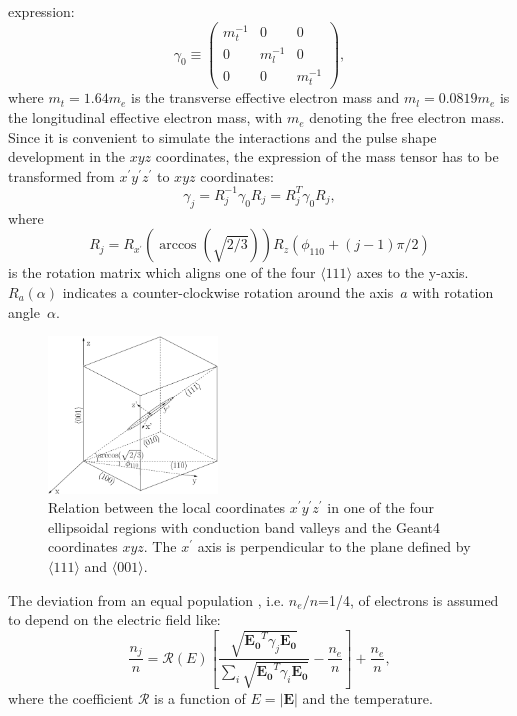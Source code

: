 expression:
\begin{equation} 
\label{eq:pss:g0} 
\gamma_{0} \equiv \left( 
\begin{array}{ccc} 
m_{t}^{-1} & 0 & 0 \\ 
0 & m_{l}^{-1} & 0 \\ 
0 & 0 & m_{t}^{-1} 
\end{array} \right), 
\end{equation} 
where $m_{t} = 1.64m_{e}$ is the transverse effective electron mass
and $m_{l} = 0.0819m_{e}$ is the longitudinal effective electron mass,
with $m_{e}$ denoting the free electron mass. Since it is convenient
to simulate the interactions and the pulse shape development in the
$xyz$ coordinates, the expression of the mass tensor has to be
transformed from $x^{\prime}y^{\prime}z^{\prime}$ to $xyz$
coordinates:
\begin{equation} 
\label{eq:pss:gs} 
\gamma_{j} = R_{j}^{-1}\gamma_{0}R_{j} = R_{j}^{T}\gamma_{0}R_{j}, 
\end{equation} 
where 
\begin{equation} 
\label{eq:pss:rs} 
R_{j} = R_{x^{\prime}}(\arccos(\sqrt{2/3}))R_{z}(\phi_{110}+(j-1)\pi/2) 
\end{equation} 
is the rotation matrix which aligns one of the four $\langle 111
\rangle$ axes to the y-axis. $R_a(\alpha)$ indicates a
counter-clockwise rotation around the axis~$a$ with rotation
angle~$\alpha$.
 
\begin{figure} 
\centering 
\includegraphics[width=0.4\textwidth]{axes}   
\caption{Relation between the local coordinates
$x^{\prime}y^{\prime}z^{\prime}$ in one of the four ellipsoidal
regions with conduction band valleys and the Geant4 coordinates
$xyz$. The $x^{\prime}$ axis is perpendicular to the plane defined by
$\langle111\rangle$ and $\langle001\rangle$.}
\label{fig:pss:axes} 
\end{figure} 
 
The deviation from an equal population , i.e. $n_{e}/n$=1/4, of
electrons is assumed to depend on the electric field like:
\begin{equation} 
\label{eq:pss:nion} 
\frac{n_{j}}{n} = \mathcal{R}(E) 
\left[ \frac{\sqrt{\mathbf{E_{0}}^{T}\gamma_{j}\mathbf{E_{0}}}}
{\sum_{i}\sqrt{\mathbf{E_{0}}^{T}\gamma_{i}\mathbf{E_{0}}}} - 
\frac{n_{e}}{n} \right] + \frac{n_{e}}{n},  
\end{equation} 
where the coefficient $\mathcal{R}$ is a function of $E=|\mathbf{E}|$
and the temperature.
 

